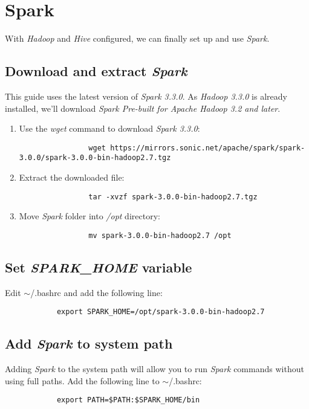 \documentclass{article}
\begin{document}
\section{Spark}
With \emph{Hadoop} and \emph{Hive} configured, we can finally set up and use \emph{Spark}.

        \subsection{Download and extract \emph{Spark}}
        This guide uses the latest version of \emph{Spark 3.3.0}. As \emph{Hadoop 3.3.0} is
        already installed, we'll download \emph{Spark Pre-built for Apache Hadoop 3.2 and later}.
        \begin{enumerate}
            \item Use the \emph{wget} command to download \emph{Spark 3.3.0}:
            \begin{verbatim}
                wget https://mirrors.sonic.net/apache/spark/spark-3.0.0/spark-3.0.0-bin-hadoop2.7.tgz
            \end{verbatim}

            \item Extract the downloaded file:
            \begin{verbatim}
                tar -xvzf spark-3.0.0-bin-hadoop2.7.tgz
            \end{verbatim}

            \item Move \emph{Spark} folder into \emph{/opt} directory:
            \begin{verbatim}
                mv spark-3.0.0-bin-hadoop2.7 /opt
            \end{verbatim}
        \end{enumerate}

        \subsection{Set \emph{SPARK\_HOME} variable}
        Edit $\sim$/.bashrc and add the following line:
        \begin{verbatim}
            export SPARK_HOME=/opt/spark-3.0.0-bin-hadoop2.7
        \end{verbatim}

        \subsection{Add \emph{Spark} to system path}
        Adding \emph{Spark} to the system path will allow you to run \emph{Spark} commands without
        using full paths. Add the following line to $\sim$/.bashrc:
        \begin{verbatim}
            export PATH=$PATH:$SPARK_HOME/bin
        \end{verbatim}
\end{document}
